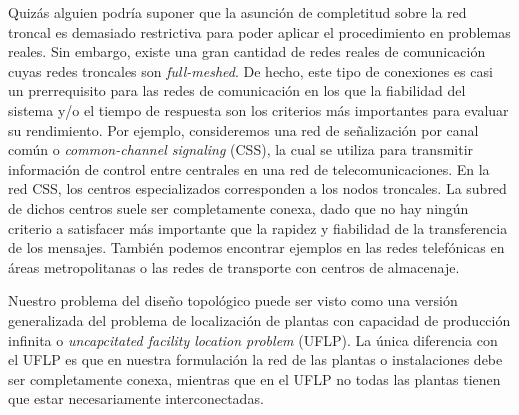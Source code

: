 \documentclass[twoside,12pt]{article}
\begin{document}
Quizás alguien podría suponer que la asunción de completitud sobre la red troncal es demasiado restrictiva para poder aplicar el procedimiento en problemas reales. Sin embargo, existe una gran cantidad de redes reales de comunicación cuyas redes troncales son \textit{full-meshed}. De hecho, este tipo de conexiones es casi un prerrequisito para las redes de comunicación en los que la fiabilidad del sistema y/o el tiempo de respuesta son los criterios más importantes para evaluar su rendimiento. Por ejemplo, consideremos una red de señalización por canal común o \textit{common-channel signaling} (CSS), la cual se utiliza para transmitir información de control entre centrales en una red de telecomunicaciones. En la red CSS, los centros especializados corresponden a los nodos troncales. La subred de dichos centros suele ser completamente conexa, dado que no hay ningún criterio a satisfacer más importante que la rapidez y fiabilidad de la transferencia de los mensajes. También podemos encontrar ejemplos en las redes telefónicas en áreas metropolitanas o las redes de transporte con centros de almacenaje. 

Nuestro problema del diseño topológico puede ser visto como una versión generalizada del problema de localización de plantas con capacidad de producción infinita o \textit{uncapcitated facility location problem} (UFLP). La única diferencia con el UFLP es que en nuestra formulación la red de las plantas o instalaciones debe ser completamente conexa, mientras que en el UFLP no todas las plantas tienen que estar necesariamente interconectadas.
\end{document}
